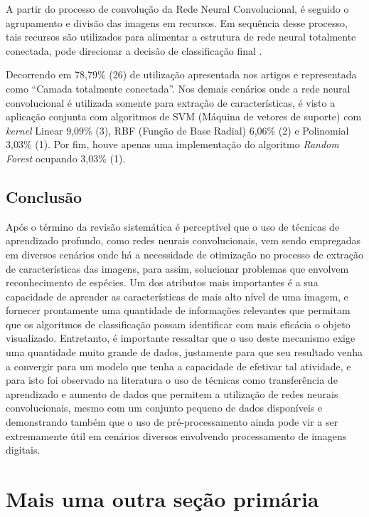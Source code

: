 \documentclass[
	12pt,				%
	oneside,			%
	a4paper,			%
	english,			%
	brazil				%
	]{abntex2ppgsi}
\begin{document}
A partir do processo de convolução da Rede Neural Convolucional, é seguido o agrupamento e divisão das imagens em recursos. Em sequência desse processo, tais recursos são utilizados para alimentar a estrutura de rede neural totalmente conectada, pode direcionar a decisão de classificação final \cite{rauf2019visual}. 

Decorrendo em 78,79\% (26) de utilização apresentada nos artigos e representada como ``Camada totalmente conectada''. Nos demais cenários onde a rede neural convolucional é utilizada somente para extração de características, é visto a aplicação conjunta com algoritmos de SVM (Máquina de vetores de suporte) com \textit{kernel} Linear 9,09\% (3), RBF (Função de Base Radial) 6,06\% (2) e Polinomial 3,03\% (1). Por fim, houve apenas uma implementação do algoritmo \textit{Random Forest} ocupando 3,03\% (1).

\section{Conclusão}

Após o término da revisão sistemática é perceptível que o uso de técnicas de aprendizado profundo, como redes neurais convolucionais, vem sendo empregadas em diversos cenários onde há a necessidade de otimização no processo de extração de características das imagens, para assim, solucionar problemas que envolvem reconhecimento de espécies. Um dos atributos mais importantes é a sua capacidade de aprender as características de mais alto nível de uma imagem, e fornecer prontamente uma quantidade de informações relevantes que permitam que os algoritmos de classificação possam identificar com mais eficácia o objeto visualizado. Entretanto, é importante ressaltar que o uso deste mecanismo exige uma quantidade muito grande de dados, justamente para que seu resultado venha a convergir para um modelo que tenha a capacidade de efetivar tal atividade, e para isto foi observado na literatura o uso de técnicas como transferência de aprendizado e aumento de dados que permitem a utilização de redes neurais convolucionais, mesmo com um conjunto pequeno de dados disponíveis e demonstrando também que o uso de pré-processamento ainda pode vir a ser extremamente útil em cenários diversos envolvendo processamento de imagens digitais.

\chapter{Mais uma outra seção primária}
\end{document}
